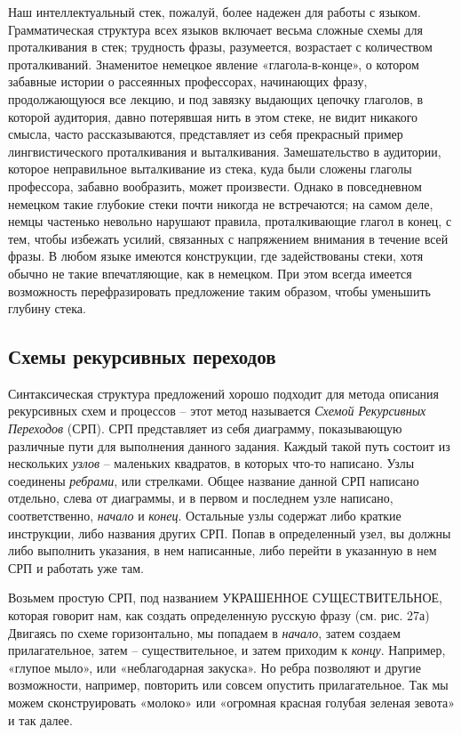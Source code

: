 \documentclass[../main.tex]{subfiles}
\begin{document}
Наш интеллектуальный стек, пожалуй, более надежен для работы с языком. Грамматическая структура всех языков включает весьма сложные схемы для проталкивания в стек; трудность фразы, разумеется, возрастает с количеством проталкиваний. Знаменитое немецкое явление «глагола-в-конце», о котором забавные истории о рассеянных профессорах, начинающих фразу, продолжающуюся все лекцию, и под завязку выдающих цепочку глаголов, в которой аудитория, давно потерявшая нить в этом стеке, не видит никакого смысла, часто рассказываются, представляет из себя прекрасный пример лингвистического проталкивания и выталкивания. Замешательство в аудитории, которое неправильное выталкивание из стека, куда были сложены глаголы профессора, забавно вообразить, может произвести. Однако в повседневном немецком такие глубокие стеки почти никогда не встречаются; на самом деле, немцы частенько невольно нарушают правила, проталкивающие глагол в конец, с тем, чтобы избежать усилий, связанных с напряжением внимания в течение всей фразы. В любом языке имеются конструкции, где задействованы стеки, хотя обычно не такие впечатляющие, как в немецком. При этом всегда имеется возможность перефразировать предложение таким образом, чтобы уменьшить глубину стека.


\subsection{Схемы рекурсивных переходов}

Синтаксическая структура предложений хорошо подходит для метода описания рекурсивных схем и процессов \--- этот метод называется \emph{Схемой Рекурсивных Переходов} (СРП). СРП представляет из себя диаграмму, показывающую различные пути для выполнения данного задания. Каждый такой путь состоит из нескольких \emph{узлов} \--- маленьких квадратов, в которых что-то написано. Узлы соединены \emph{ребрами}, или стрелками. Общее название данной СРП написано отдельно, слева от диаграммы, и в первом и последнем узле написано, соответственно, \emph{начало} и \emph{конец}. Остальные узлы содержат либо краткие инструкции, либо названия других СРП\@. Попав в определенный узел, вы должны либо выполнить указания, в нем написанные, либо перейти в указанную в нем СРП и работать уже там.

Возьмем простую СРП, под названием УКРАШЕННОЕ СУЩЕСТВИТЕЛЬНОЕ, которая говорит нам, как создать определенную русскую фразу (см. рис. 27а) Двигаясь по схеме горизонтально, мы попадаем в \emph{начало}, затем создаем прилагательное, затем \--- существительное, и затем приходим к \emph{концу}. Например, «глупое мыло», или «неблагодарная закуска». Но ребра позволяют и другие возможности, например, повторить или совсем опустить прилагательное. Так мы можем сконструировать «молоко» или «огромная красная голубая зеленая зевота» и так далее.
\end{document}
